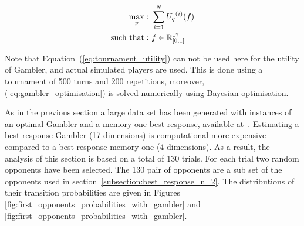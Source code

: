 \begin{equation}\label{eq:gambler_optimisation}
    \begin{aligned}
    \max_p: & \ \sum_{i=1} ^ {N} {U_q}^{(i)} (f)
    \\
    \text{such that}: & \ f \in \mathbb{R}_{[0, 1]}^{17}
    \end{aligned}
\end{equation}

Note that Equation~(\ref{eq:tournament_utility}) can not be used here for the
utility of Gambler, and actual simulated players are used. This is done using a
tournament of 500 turns and 200 repetitions, moreover,
(\ref{eq:gambler_optimisation}) is solved numerically using Bayesian
optimisation.

As in the previous section a large data set has been generated with
instances of an optimal Gambler and a memory-one best response, available
at~\cite{glynatsi2019}. Estimating a best response Gambler (17 dimensions) is
computational more expensive compared to a best response memory-one (4
dimensions). As a result, the analysis of this section is based on a total of
130 trials. For each trial two random opponents have been selected. The 130 pair
of opponents are a sub set of the opponents used in
section~\ref{subsection:best_response_n_2}. The distributions of their
transition probabilities are given in Figures
\ref{fig:first_opponents_probabilities_with_gambler} and
\ref{fig:first_opponents_probabilities_with_gambler}.

